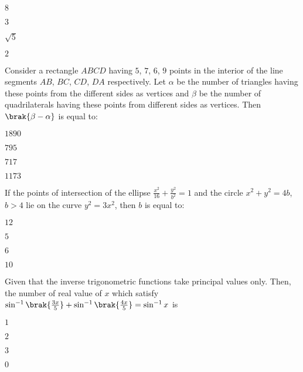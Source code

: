 \hfill{}
\begin{enumerate}
\begin{multicols}{4}
\item $8$
\item $3$
\item $\sqrt{5}$
\item $2$
\end{multicols}
\end{enumerate}

\item Consider a rectangle $ABCD$ having $5$, $7$, $6$, $9$ points in the interior of the line segments $AB$, $BC$, $CD$, $DA$ respectively. Let $\alpha$ be the number of triangles having these points from the different sides as vertices and $\beta$ be the number of quadrilaterals having these points from different sides as vertices. Then $\brak{\beta-\alpha}$ is equal to: 

\hfill{}
\begin{enumerate}
\begin{multicols}{4}
\item $1890$
\item $795$
\item $717$
\item $1173$
\end{multicols}
\end{enumerate}

\item If the points of intersection of the ellipse $\frac{x^2}{16}+\frac{y^2}{b^2}=1$ and the circle $x^2+y^2=4b$, $b>4$ lie on the curve $y^2=3x^2$, then $b$ is equal to:

\hfill{}
\begin{enumerate}
\begin{multicols}{4}
\item $12$
\item $5$
\item $6$
\item $10$
\end{multicols}
\end{enumerate}

\item Given that the inverse trigonometric functions take principal values only. Then, the number of real value of $x$ which satisfy $\sin^{-1}\brak{\frac{3x}{5}}+\sin^{-1}\brak{\frac{4x}{5}} = \sin^{-1}x$ is 

\hfill{}
\begin{enumerate}
\begin{multicols}{4}
\item $1$
\item $2$
\item $3$
\item $0$
\end{multicols}
\end{enumerate}

